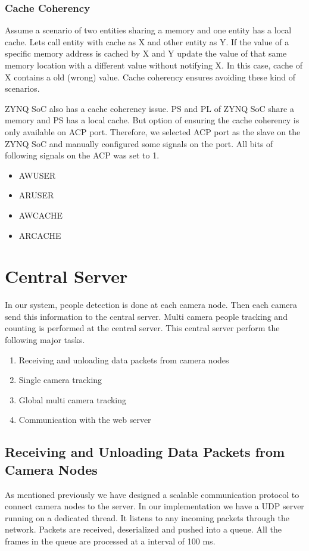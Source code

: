 \documentclass[12pt,a4paper]{report}
\begin{document}
\subsubsection{Cache Coherency}

Assume a scenario of two entities sharing a memory and one entity has a local cache. Lets call entity with cache as X and other entity as Y. If the value of a specific memory address is cached by X and Y update the value of that same memory location with a different value without notifying X. In this case, cache of X contains a old (wrong) value.  Cache coherency ensures avoiding these kind of scenarios. 
\par ZYNQ SoC also has a cache coherency issue. PS and PL of ZYNQ SoC share a memory and PS has a local cache. But option of ensuring the cache coherency is only available on ACP port. Therefore, we selected ACP port as the slave on the ZYNQ SoC and manually configured some signals on the port. All bits of following signals on the ACP was set to 1.
\begin{itemize}
\item AWUSER
\item ARUSER
\item AWCACHE
\item ARCACHE
\end{itemize}



\section{Central Server}
In our system, people detection is done at each camera node. Then each camera send this information to the central server. Multi camera people tracking and counting is performed at the central server. This central server perform the following major tasks.
\begin{enumerate}
\item Receiving and unloading data packets from camera nodes
\item Single camera tracking
\item Global multi camera tracking
\item Communication with the web server
\end{enumerate}

\subsection{Receiving and Unloading Data Packets from Camera Nodes}
As mentioned previously we have designed a scalable communication protocol to connect camera nodes to the server. In our implementation we have a UDP server running on a dedicated thread. It listens to any incoming packets through the network. Packets are received, deserialized and pushed into a queue. All the frames in the queue are processed at a interval of 100 ms.
\end{document}
